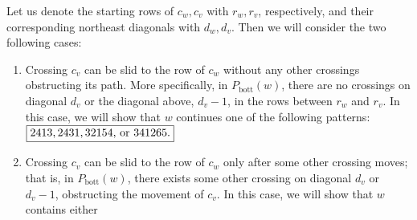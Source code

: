 \documentclass{article}
\theoremstyle{definition} %
\begin{document}
Let us denote the starting rows of $c_w, c_v$ with $r_w, r_v$, respectively, and their corresponding northeast diagonals with $d_w, d_v$. Then we will consider the two following cases:
\begin{enumerate}
    \item Crossing $c_v$ can be slid to the row of $c_w$ without any other crossings obstructing its path. More specifically, in $P_{\text{bott}}(w)$, there are no crossings on diagonal $d_v$ or the diagonal above, $d_v-1$, in the rows between $r_w$ and $r_v$. In this case, we will show that $w$ continues one of the following patterns: $\boxed{2413, 2431, 32154,$ or $341265.}$
    \item Crossing $c_v$ can be slid to the row of $c_w$ only after some other crossing moves; that is, in $P_{\text{bott}}(w)$, there exists some other crossing on diagonal $d_v$ or $d_v-1$, obstructing the movement of $c_v$. In this case, we will show that $w$ contains either 
\end{enumerate}
\vspace{1em}
\end{document}
